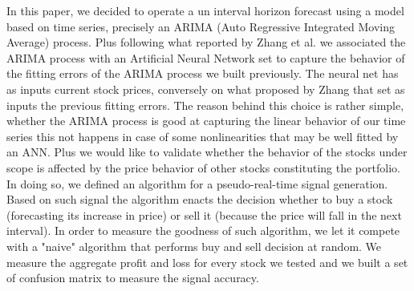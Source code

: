 \documentclass[twocolumn]{article}
\begin{document}
In this paper, we decided to operate a un interval horizon forecast using a model based on time series, precisely an ARIMA (Auto Regressive Integrated Moving Average) process. Plus following what reported by Zhang et al.\cite{zhang_time_2003} we associated the ARIMA process with an Artificial Neural Network set to capture the behavior of the fitting errors of the ARIMA process we built previously. The neural net has as inputs current stock prices, conversely on what proposed by Zhang that set as inputs the previous fitting errors. The reason behind this choice is rather simple, whether the ARIMA process is good at capturing the linear behavior of our time series this not happens in case of some nonlinearities that may be well fitted by an ANN. Plus we would like to validate whether the behavior of the stocks under scope is affected by the price behavior of other stocks constituting the portfolio.
In doing so, we defined an algorithm for a pseudo-real-time signal generation. Based on such signal the algorithm enacts the decision whether to buy a stock (forecasting its increase in price) or sell it (because the price will fall in the next interval). In order to measure the goodness of such algorithm, we let it compete with a "naive" algorithm that performs buy and sell decision at random. We measure the aggregate profit and loss for every stock we tested and we built a set of confusion matrix to measure the signal accuracy.

\begin{center}
\end{center}
\label{algoproces}
\end{document}
